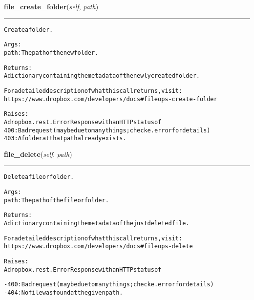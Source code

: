 \hspace{.8\funcindent}\begin{boxedminipage}{\funcwidth}

    \raggedright \textbf{file\_create\_folder}(\textit{self}, \textit{path})

    \vspace{-1.5ex}

    \rule{\textwidth}{0.5\fboxrule}
\setlength{\parskip}{2ex}
\begin{alltt}
Create a folder.

Args:
    path: The path of the new folder.

Returns:
    A dictionary containing the metadata of the newly created folder.

    For a detailed description of what this call returns, visit:
    https://www.dropbox.com/developers/docs\#fileops-create-folder

Raises:
    A dropbox.rest.ErrorResponse with an HTTP status of
       400: Bad request (may be due to many things; check e.error for details)
       403: A folder at that path already exists.
\end{alltt}

\setlength{\parskip}{1ex}
    \end{boxedminipage}

    \label{lib:dropbox:DropboxClient:file_delete}

    \vspace{0.5ex}

\hspace{.8\funcindent}\begin{boxedminipage}{\funcwidth}

    \raggedright \textbf{file\_delete}(\textit{self}, \textit{path})

    \vspace{-1.5ex}

    \rule{\textwidth}{0.5\fboxrule}
\setlength{\parskip}{2ex}
\begin{alltt}
Delete a file or folder.

Args:
    path: The path of the file or folder.

Returns:
    A dictionary containing the metadata of the just deleted file.

    For a detailed description of what this call returns, visit:
    https://www.dropbox.com/developers/docs\#fileops-delete

Raises:
    A dropbox.rest.ErrorResponse with an HTTP status of

    - 400: Bad request (may be due to many things; check e.error for details)
    - 404: No file was found at the given path.
\end{alltt}

\setlength{\parskip}{1ex}
    \end{boxedminipage}

